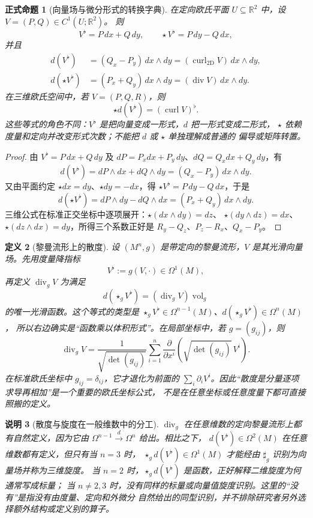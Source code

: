 \documentclass[UTF8,fontset=none,a4paper,11pt]{ctexart}
\theoremstyle{foundation-definition}
\newtheorem{definition}{定义}[section]
\theoremstyle{foundation-theorem}
\theoremstyle{foundation-proposition}
\newtheorem{proposition}[definition]{正式命题}
\theoremstyle{foundation-example}
\theoremstyle{foundation-remark}
\newtheorem{remark}[definition]{说明}
\theoremstyle{foundation-theorem}
\begin{document}
\begin{proposition}[向量场与微分形式的转换字典]\label{prop:vector-form-dictionary}
在定向欧氏平面 \(U\subseteq\mathbb R^2\) 中，设 \(V=(P,Q)\in C^1(U;\mathbb R^2)\)。
则
\[
V^\flat=P\,dx+Q\,dy,\qquad
\star V^\flat=P\,dy-Q\,dx,
\]
并且
\[
\begin{aligned}
d(V^\flat)&=(Q_x-P_y)\,dx\wedge dy
          =(\operatorname{curl}_{2\mathrm D}V)\,dx\wedge dy,\\
d(\star V^\flat)&=(P_x+Q_y)\,dx\wedge dy
          =(\operatorname{div}V)\,dx\wedge dy.
\end{aligned}
\]
在三维欧氏空间中，若 \(V=(P,Q,R)\)，则
\[
\star d(V^\flat)=(\operatorname{curl}V)^\flat.
\]
这些等式的角色不同：\(V^\flat\) 是把向量变成一形式，\(d\) 把一形式变成二形式，
\(\star\) 依赖度量和定向并改变形式次数；不能把 \(d\) 或 \(\star\) 单独理解成普通的
偏导或矩阵转置。
\end{proposition}

\begin{proof}
由 \(V^\flat=P\,dx+Q\,dy\) 及
\(dP=P_xdx+P_y\,dy\)、\(dQ=Q_xdx+Q_y\,dy\)，有
\[
d(V^\flat)
=dP\wedge dx+dQ\wedge dy
=(Q_x-P_y)\,dx\wedge dy.
\]
又由平面约定 \(\star dx=dy\)、\(\star dy=-dx\)，得
\(\star V^\flat=P\,dy-Q\,dx\)，于是
\[
d(\star V^\flat)
=dP\wedge dy-dQ\wedge dx
=(P_x+Q_y)\,dx\wedge dy.
\]
三维公式在标准正交坐标中逐项展开：\(\star(dx\wedge dy)=dz\)、
\(\star(dy\wedge dz)=dx\)、\(\star(dz\wedge dx)=dy\)，所得三个系数正好是
\(R_y-Q_z\)、\(P_z-R_x\)、\(Q_x-P_y\)。
\end{proof}

\begin{definition}[黎曼流形上的散度]\label{def:riemannian-divergence}
设 \((M^n,g)\) 是带定向的黎曼流形，\(V\) 是其光滑向量场。先用度量降指标
\[
V^\flat:=g(V,\mathord\cdot)\in\Omega^1(M),
\]
再定义 \(\operatorname{div}_gV\) 为满足
\[
d(\star_gV^\flat)=(\operatorname{div}_gV)\operatorname{vol}_g
\]
的唯一光滑函数。这个等式的类型是
\(\star_gV^\flat\in\Omega^{n-1}(M)\)、\(d(\star_gV^\flat)\in\Omega^n(M)\)，
所以右边确实是“函数乘以体积形式”。在局部坐标中，若 \(g=(g_{ij})\)，则
\[
\operatorname{div}_gV
=\frac{1}{\sqrt{\det(g_{ij})}}
\sum_{i=1}^n\frac{\partial}{\partial x^i}
\left(\sqrt{\det(g_{ij})}\,V^i\right).
\]
在标准欧氏坐标中 \(g_{ij}=\delta_{ij}\)，它才退化为前面的
\(\sum_i\partial_iV^i\)。因此“散度是分量逐项求导再相加”是一个重要的欧氏坐标公式，
不是在任意坐标或任意度量下都可直接照搬的定义。
\end{definition}

\begin{remark}[散度与旋度在一般维数中的分工]
\(\operatorname{div}_g\) 在任意维数的定向黎曼流形上都有自然定义，因为它由
\(\Omega^{n-1}\xrightarrow{d}\Omega^n\) 给出。相比之下，
\(d(V^\flat)\in\Omega^2(M)\) 在任意维数都有定义，但只有当 \(n=3\) 时，
\(\star_gd(V^\flat)\in\Omega^1(M)\) 才能经由 \(\sharp_g\) 识别为向量场并称为三维旋度。
当 \(n=2\) 时，\(\star_gd(V^\flat)\) 是函数，正好解释二维旋度为何通常写成标量；
当 \(n\neq2,3\) 时，没有同样的标量或向量值旋度识别。这里的“没有”是指没有由度量、定向和外微分
自然给出的同型识别，并不排除研究者另外选择额外结构或定义别的算子。
\end{remark}
\end{document}
